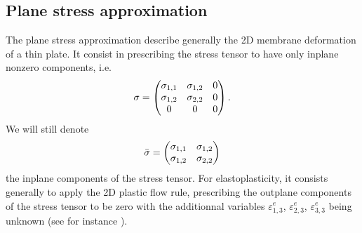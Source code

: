 \documentclass[a4paper,11pt,english]{sphinxmanual}
\begin{document}
\subsection{Plane stress approximation}
\label{\detokenize{userdoc/model_plasticity_small_strain:plane-stress-approximation}}
The plane stress approximation describe generally the 2D membrane deformation of a thin plate. It consist in prescribing the stress tensor to have only in\sphinxhyphen{}plane nonzero components, i.e.
\begin{equation*}
\begin{split}\sigma = \left(\hspace{-0.5em}\begin{array}{ccc} \sigma_{1,1} & \sigma_{1,2} & 0 \\ \sigma_{1,2} & \sigma_{2,2} & 0 \\ 0 & 0 & 0 \end{array}\hspace{-0.5em}\right).\end{split}
\end{equation*}
We will still denote
\begin{equation*}
\begin{split}\bar{\sigma} =  \left(\hspace{-0.5em}\begin{array}{cc} \sigma_{1,1} & \sigma_{1,2} \\ \sigma_{1,2} & \sigma_{2,2} \end{array}\hspace{-0.5em}\right)\end{split}
\end{equation*}
the in\sphinxhyphen{}plane components of the stress tensor. For elastoplasticity, it consists generally to apply the 2D plastic flow rule, prescribing the out\sphinxhyphen{}plane components of the stress tensor to be zero with the additionnal variables \(\varepsilon^e_{1,3}\), \(\varepsilon^e_{2,3}\), \(\varepsilon^e_{3,3}\) being unknown (see for instance ).
\end{document}
